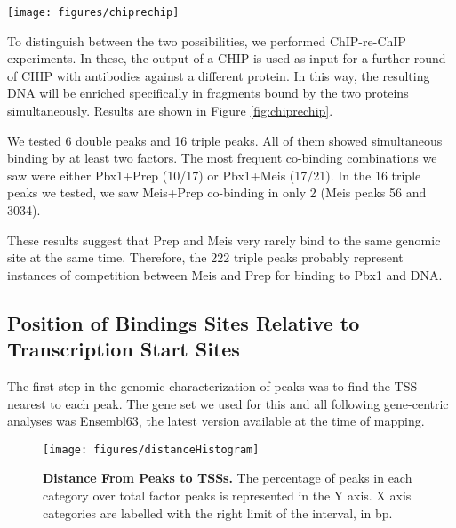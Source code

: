 \begin{SCfigure}[]
  \centering
  \texttt{[image: figures/chiprechip]}
  \caption[ChIP-re-ChIP experiments]{\textbf{ChIP-re-ChIP experiments.} Factors were subjected to succesive round of \ac{CHIP} with antibodies with different specificities, as indicated. Unspecific antibody (IgG) was used as a negative control. Purified DNA was amplified in a rate-limiting \ac{PCR} to obtain an amount of product roughly proportional to the peak DNA present. Band intensities over IgG band were considered as positive signals.}
  \label{fig:chiprechip}
\end{SCfigure}

To distinguish between the two possibilities, we performed ChIP-re-ChIP experiments. In these, the output of a \ac{CHIP} is used as input for a further round of \ac{CHIP} with antibodies against a different protein. In this way, the resulting DNA will be enriched specifically in fragments bound by the two proteins simultaneously. Results are shown in Figure \ref{fig:chiprechip}.

We tested 6 double peaks and 16 triple peaks. All of them showed simultaneous binding by at least two factors. The most frequent co-binding combinations we saw were either Pbx1+Prep (10/17) or Pbx1+Meis (17/21). In the 16 triple peaks we tested, we saw Meis+Prep co-binding in only 2 (Meis peaks 56 and 3034).

These results suggest that Prep and Meis very rarely bind to the same genomic site at the same time. Therefore, the 222 triple peaks probably represent instances of competition between Meis and Prep for binding to Pbx1 and DNA. %


\subsection{Position of Bindings Sites Relative to Transcription Start Sites}

The first step in the genomic characterization of peaks was to find the \ac{TSS} nearest to each peak. The gene set we used for this and all following gene-centric analyses was Ensembl63, the latest version available at the time of mapping.

\begin{figure}[]
  
  \centering
  \texttt{[image: figures/distanceHistogram]}
  \caption[Distance From Peaks to \ac{TSS}s]{\textbf{Distance From Peaks to \ac{TSS}s.} The percentage of peaks in each category over total factor peaks is represented in the Y axis. X axis categories are labelled with the right limit of the interval, in \ac{bp}.}
  \label{fig:distanceHistogram}
\end{figure}

